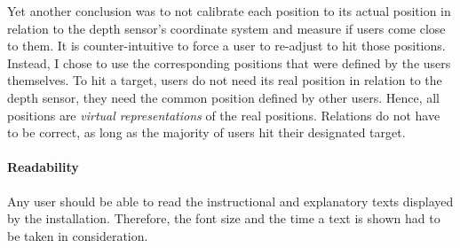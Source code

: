 Yet another conclusion was to not calibrate each position to its actual position in relation to the depth sensor's coordinate system  and measure if users come close to them. It is counter-intuitive to force a user to re-adjust to hit those positions. Instead, I chose to use the corresponding positions that were defined by the users themselves. To hit a target, users do not need its real position in relation to the depth sensor, they need the common position defined by other users. Hence, all positions are \textit{virtual representations} of the real positions. Relations do not have to be correct, as long as the majority of users hit their designated target. 


\paragraph{Readability} Any user should be able to read the instructional and explanatory texts displayed by the installation. Therefore, the font size and the time a text is shown had to be taken in consideration. 

